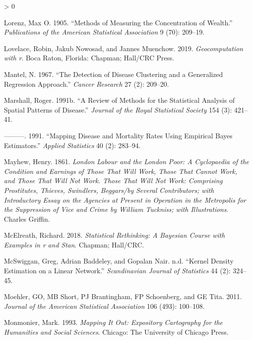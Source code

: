 \documentclass[
  krantz2]{krantz}
\newlength{\cslhangindent}
\newenvironment{CSLReferences}[2] %
 {%
  \setlength{\parindent}{0pt}
  \ifodd #1 \everypar{\setlength{\hangindent}{\cslhangindent}}\ignorespaces\fi
  \ifnum #2 > 0
  \setlength{\parskip}{#2\baselineskip}
  \fi
 }%
 {}
\begin{document}
\begin{CSLReferences}{1}{0}
\leavevmode\hypertarget{ref-lorenz1905methods}{}%
Lorenz, Max O. 1905. {``Methods of Measuring the Concentration of Wealth.''} \emph{Publications of the American Statistical Association} 9 (70): 209--19.

\leavevmode\hypertarget{ref-Lovelace_2019}{}%
Lovelace, Robin, Jakub Nowosad, and Jannes Muenchow. 2019. \emph{Geocomputation with r}. Boca Raton, Florida: Chapman; Hall/CRC Press.

\leavevmode\hypertarget{ref-Mantel_1967}{}%
Mantel, N. 1967. {``The Detection of Disease Clustering and a Generalized Regression Approach.''} \emph{Cancer Research} 27 (2): 209--20.

\leavevmode\hypertarget{ref-Marshall_1991b}{}%
Marshall, Roger. 1991b. {``A Review of Methods for the Statistical Analysis of Spatial Patterns of Disease.''} \emph{Journal of the Royal Statistical Society} 154 (3): 421--41.

\leavevmode\hypertarget{ref-Marshall_1991}{}%
---------. 1991. {``Mapping Disease and Mortality Rates Using Empirical Bayes Estimators.''} \emph{Applied Statistics} 40 (2): 283--94.

\leavevmode\hypertarget{ref-Mayhew_1861}{}%
Mayhew, Henry. 1861. \emph{London Labour and the London Poor: A Cyclopaedia of the Condition and Earnings of Those That Will Work, Those That Cannot Work, and Those That Will Not Work. Those That Will Not Work: Comprising Prostitutes, Thieves, Swindlers, Beggars/by Several Contributors; with Introductory Essay on the Agencies at Present in Operation in the Metropolis for the Suppression of Vice and Crime by William Tuckniss; with Illustrations}. Charles Griffin.

\leavevmode\hypertarget{ref-McElreath_2018}{}%
McElreath, Richard. 2018. \emph{Statistical Rethinking: A Bayesian Course with Examples in r and Stan}. Chapman; Hall/CRC.

\leavevmode\hypertarget{ref-McSwiggan_2016}{}%
McSwiggan, Greg, Adrian Baddeley, and Gopalan Nair. n.d. {``Kernel Density Estimation on a Linear Network.''} \emph{Scandinavian Journal of Statistics} 44 (2): 324--45.

\leavevmode\hypertarget{ref-Mohler_2011}{}%
Moehler, GO, MB Short, PJ Brantingham, FP Schoenberg, and GE Tita. 2011. \emph{Journal of the American Statistical Association} 106 (493): 100--108.

\leavevmode\hypertarget{ref-Monmonier_1993}{}%
Monmonier, Mark. 1993. \emph{Mapping It Out: Expository Cartography for the Humanities and Social Sciences}. Chicago: The University of Chicago Press.


\end{CSLReferences}
\end{document}
